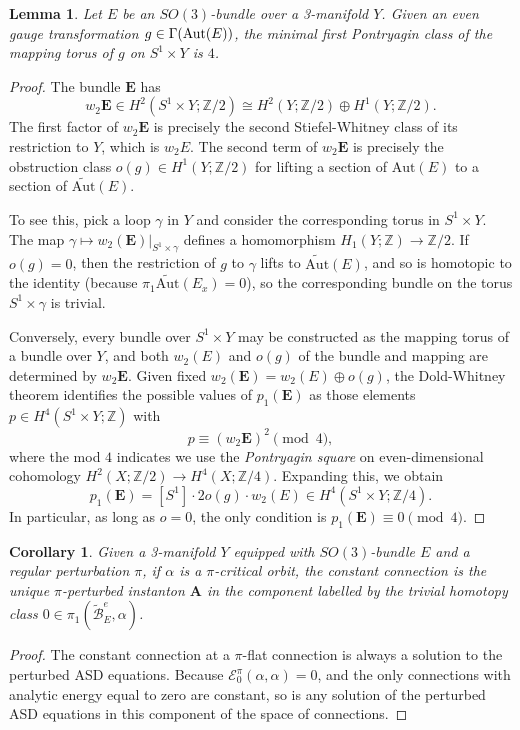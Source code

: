 \documentclass[10pt,a4paper]{amsart}
\newtheorem{lemma}[theorem]{Lemma}
\newtheorem{corollary}[theorem]{Corollary}
\theoremstyle{definition}
\theoremstyle{remark}
\numberwithin{figure}{qchap}
\begin{document}
\begin{lemma}Let $E$ be an $SO(3)$-bundle over a 3-manifold $Y$. Given an even gauge transformation $g \in \Gamma(\textup{Aut}(E))$, the minimal first Pontryagin class of the mapping torus of $g$ on $S^1 \times Y$ is $4$.\end{lemma}
\begin{proof}
The bundle $\mathbf{E}$ has 
$$w_2 \mathbf{E} \in H^2(S^1 \times Y;\mathbb Z/2) \cong H^2(Y;\mathbb Z/2) \oplus H^1(Y;\mathbb Z/2).$$ 
The first factor of $w_2 \mathbf{E}$ is precisely the second Stiefel-Whitney class of its restriction to $Y$, which is $w_2 E$. The second term of $w_2 \mathbf{E}$ is precisely the obstruction class $o(g) \in H^1(Y;\mathbb Z/2)$ for lifting a section of $\text{Aut}(E)$ to a section of $\widetilde{\text{Aut}}(E)$. 

To see this, pick a loop $\gamma$ in $Y$ and consider the corresponding torus in $S^1 \times Y$. The map $\gamma \mapsto w_2(\mathbf{E})\big|_{S^1 \times \gamma}$ defines a homomorphism $H_1(Y;\mathbb Z) \to \mathbb Z/2$. If $o(g) = 0$, then the restriction of $g$ to $\gamma$ lifts to $\widetilde{\text{Aut}}(E)$, and so is homotopic to the identity (because $\pi_1 \widetilde{\text{Aut}}(E_x) = 0$), so the corresponding bundle on the torus $S^1 \times \gamma$ is trivial. 

Conversely, every bundle over $S^1 \times Y$ may be constructed as the mapping torus of a bundle over $Y$, and both $w_2(E)$ and $o(g)$ of the bundle and mapping are determined by $w_2 \mathbf{E}$. Given fixed $w_2(\mathbf{E}) = w_2(E) \oplus o(g)$, the Dold-Whitney theorem identifies the possible values of $p_1(\mathbf{E})$ as those elements $p \in H^4(S^1 \times Y;\mathbb Z)$ with 
$$p \equiv (w_2 \mathbf{E})^2 \pmod 4,$$ 
where the mod $4$ indicates we use the \emph{Pontryagin square} on even-dimensional cohomology $H^2(X;\mathbb Z/2) \to H^4(X;\mathbb Z/4)$. Expanding this, we obtain 
$$p_1(\mathbf{E}) = [S^1] \cdot 2o(g) \cdot w_2(E) \in H^4(S^1 \times Y;\mathbb Z/4).$$
In particular, as long as $o = 0$, the only condition is $p_1(\mathbf{E}) \equiv 0 \pmod 4$. 
\end{proof}

\begin{corollary}\label{triv-component}Given a 3-manifold $Y$ equipped with $SO(3)$-bundle $E$ and a regular perturbation $\pi$, if $\alpha$ is a $\pi$-critical orbit, the constant connection is the unique $\pi$-perturbed instanton $\mathbf{A}$ in the component labelled by the trivial homotopy class $0 \in \pi_1(\widetilde{\mathcal B}^e_E,\alpha)$.
\end{corollary}
\begin{proof}
The constant connection at a $\pi$-flat connection is always a solution to the perturbed ASD equations. Because $\mathcal E^\pi_0(\alpha, \alpha) = 0$, and the only connections with analytic energy equal to zero are constant, so is any solution of the perturbed ASD equations in this component of the space of connections.
\end{proof}
\end{document}
